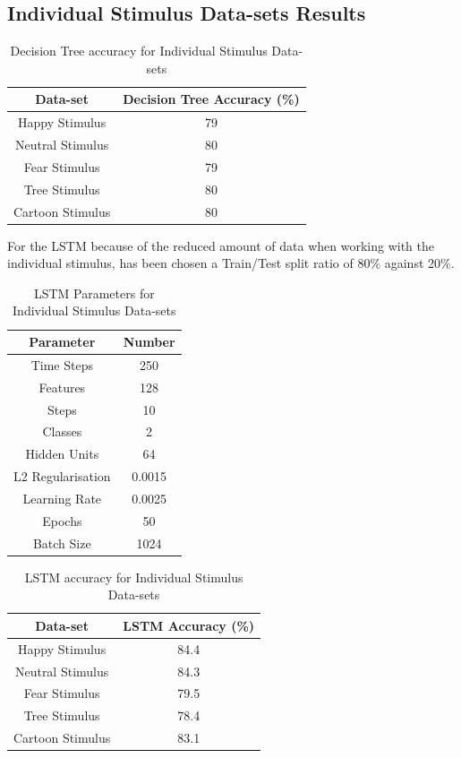 \begin{appendices}
\clearpage
\section{Individual Stimulus Data-sets Results}
\setcounter{figure}{0}
\setcounter{table}{0}
{
\begin{table}[h!]
\centering
\begin{tabular}{|c|c|}
\hline
Data-set &Decision Tree Accuracy (\%) \\
\hline
Happy Stimulus & 79  \\
Neutral Stimulus & 80  \\
Fear Stimulus & 79  \\
Tree Stimulus & 80 \\
Cartoon Stimulus & 80 \\
\hline
\end{tabular}
\caption{Decision Tree accuracy for Individual Stimulus Data-sets}
\label{table:1}
\end{table}
}

For the LSTM because of the reduced amount of data when working with the individual stimulus, has been chosen a Train/Test split ratio of 80\% against 20\%.

{
\begin{table}[h!]
\centering
\begin{tabular}{|c|c|}
\hline
Parameter &Number \\
\hline
Time Steps & 250  \\
Features & 128  \\
Steps & 10  \\
Classes & 2 \\
Hidden Units & 64 \\
L2 Regularisation & 0.0015 \\
Learning Rate & 0.0025 \\
Epochs & 50 \\
Batch Size & 1024 \\
\hline
\end{tabular}
\caption{LSTM Parameters for Individual Stimulus Data-sets}
\label{table:1}
\end{table}
}

{
\begin{table}[h!]
\centering
\begin{tabular}{|c|c|}
\hline
Data-set &LSTM Accuracy (\%) \\
\hline
Happy Stimulus & 84.4  \\
Neutral Stimulus & 84.3  \\
Fear Stimulus & 79.5  \\
Tree Stimulus & 78.4 \\
Cartoon Stimulus & 83.1 \\
\hline
\end{tabular}
\caption{LSTM accuracy for Individual Stimulus Data-sets}
\label{table:1}
\end{table}
}


\end{appendices}
